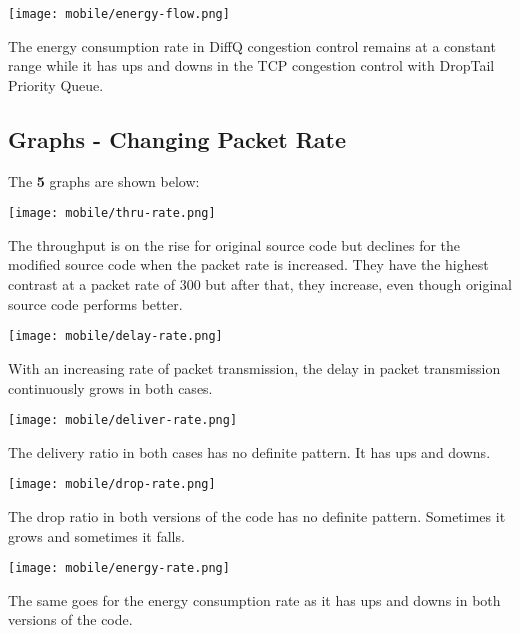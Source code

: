 \documentclass{article}
\begin{document}
\begin{center}
    \texttt{[image: mobile/energy-flow.png]}
\end{center}

The energy consumption rate in DiffQ congestion control remains at a constant range while it has ups and downs in the TCP congestion control with DropTail Priority Queue.

\subsection{Graphs - Changing Packet Rate}
The \textbf{5} graphs are shown below:

\begin{center}
    \texttt{[image: mobile/thru-rate.png]}
\end{center}

The throughput is on the rise for original source code but declines for the modified source code when the packet rate is increased. They have the highest contrast at a packet rate of $300$ but after that, they increase, even though original source code performs better.

\begin{center}
    \texttt{[image: mobile/delay-rate.png]}
\end{center}

With an increasing rate of packet transmission, the delay in packet transmission continuously grows in both cases.

\begin{center}
    \texttt{[image: mobile/deliver-rate.png]}
\end{center}

The delivery ratio in both cases has no definite pattern. It has ups and downs.

\begin{center}
    \texttt{[image: mobile/drop-rate.png]}
\end{center}

The drop ratio in both versions of the code has no definite pattern. Sometimes it grows and sometimes it falls.

\begin{center}
    \texttt{[image: mobile/energy-rate.png]}
\end{center}

The same goes for the energy consumption rate as it has ups and downs in both versions of the code.
\end{document}

